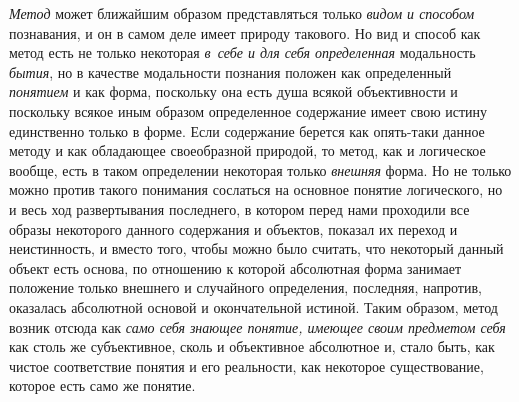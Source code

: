 {\em Метод} может ближайшим
образом представляться только {\em видом
и способом} познавания, и он в самом деле имеет природу
такового. Но вид и способ как метод есть не только некоторая
{\em в~себе и для себя определенная}
модальность {\em бытия},
но в качестве модальности познания положен как определенный
{\em понятием} и как
форма, поскольку она есть душа всякой объективности и поскольку всякое иным
образом определенное содержание имеет свою истину единственно только в
форме. Если содержание берется как опять-таки данное методу и как
обладающее своеобразной природой, то метод, как и логическое вообще, есть в
таком определении некоторая только
{\em внешняя} форма. Но
не только можно против такого понимания сослаться на основное понятие
логического, но и весь ход развертывания последнего, в котором перед нами
проходили все образы некоторого данного содержания и объектов, показал их
переход и неистинность, и вместо того, чтобы можно было считать, что
некоторый данный объект есть основа, по отношению к которой абсолютная
форма занимает положение только внешнего и случайного определения,
последняя, напротив, оказалась абсолютной основой и окончательной истиной.
Таким образом, метод возник отсюда как
{\em само себя знающее понятие, имеющее
своим предметом себя} как столь же субъективное, сколь и
объективное абсолютное и, стало быть, как чистое соответствие понятия и его
реальности, как некоторое существование, которое есть само же понятие.

